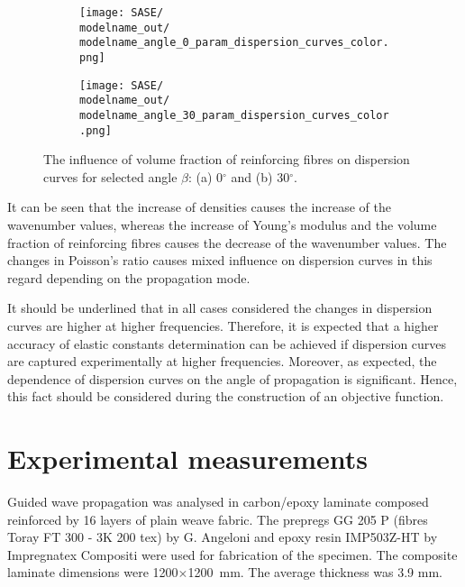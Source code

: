 \documentclass[preprint,12pt]{elsarticle}
\begin{document}
\begin{figure} [h!]
	\centering
	\newcommand{\modelname}{SASE8_plain_weave}
	\begin{subfigure}[b]{0.49\textwidth}
		\centering
		
		
\texttt{[image: SASE/\\modelname\_out/\\modelname\_angle\_0\_param\_dispersion\_curves\_color.png]}
		\caption{}
		\label{fig:vol0}
	\end{subfigure}
	\hfill
	\begin{subfigure}[b]{0.49\textwidth}
		\centering
		
		
\texttt{[image: SASE/\\modelname\_out/\\modelname\_angle\_30\_param\_dispersion\_curves\_color.png]}
		\caption{}
		\label{fig:vol30}
	\end{subfigure}

	\caption{The influence of volume fraction of reinforcing fibres on dispersion curves 
	for selected angle \(\beta\): (a) 0\(^{\circ}\) and (b) 30\(^{\circ}\).} 
	\label{fig:vol}
\end{figure}

It can be seen that the increase of densities causes the increase of the wavenumber 
values, whereas the 
increase of  Young's modulus and the volume fraction of reinforcing fibres causes the 
decrease of the 
wavenumber values. The changes in Poisson's ratio causes mixed influence on 
dispersion curves in this 
regard depending on the propagation mode.

It should be underlined that in all cases considered the changes in dispersion curves 
are higher at higher 
frequencies. Therefore, it is expected that a higher accuracy of elastic constants 
determination can be 
achieved if dispersion curves are captured experimentally at higher frequencies. 
Moreover, as expected, 
the 
dependence of dispersion curves on the angle of propagation is significant. Hence, this 
fact should be 
considered during the construction of an objective function.
\section{Experimental measurements \label{sec:experiment}}
Guided wave propagation was analysed in carbon/epoxy laminate composed reinforced 
by 16 layers of plain weave fabric. The prepregs GG 205  P (fibres Toray FT 300 - 3K 
200 tex) by G. Angeloni and epoxy resin IMP503Z-HT by Impregnatex Compositi were 
used for fabrication of the specimen. The composite laminate dimensions were 
1200\(\times\)1200~mm. The average thickness was 3.9 mm. 
\end{document}
